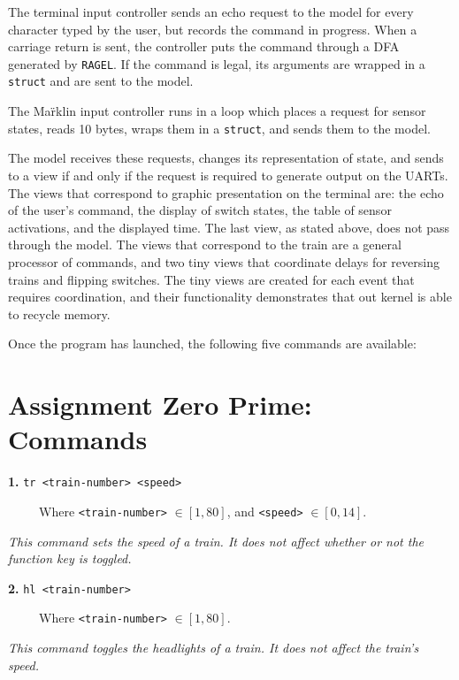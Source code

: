 \documentclass{amsart}
\begin{document}
The terminal input controller sends an echo request to the model for every character typed by the user, but records the command in progress. When a carriage return is sent, the controller puts the command through a DFA generated by \texttt{RAGEL}. If the command is legal, its arguments are wrapped in a \texttt{struct} and are sent to the model.

The Ma\"rklin input controller runs in a loop which places a request for sensor states, reads 10 bytes, wraps them in a \texttt{struct}, and sends them to the model.

The model receives these requests, changes its representation of state, and sends to a view if and only if the request is required to generate output on the UARTs. The views that correspond to graphic presentation on the terminal are: the echo of the user's command, the display of switch states, the table of sensor activations, and the displayed time. The last view, as stated above, does not pass through the model. The views that correspond to the train are a general processor of commands, and two tiny views that coordinate delays for reversing trains and flipping switches. The tiny views are created for each event that requires coordination, and their functionality demonstrates that out kernel is able to recycle memory.

Once the program has launched, the following five commands are available:

\section*{Assignment Zero Prime: Commands}

\vspace{0.3cm}
\textbf{1.} \texttt{tr <train-number> <speed>}

\ \ \ \ \ Where \texttt{<train-number>} $\in [1,80]$, and \texttt{<speed>} $\in [0,14]$.

\vspace{0.3cm}
\textit{This command sets the speed of a train. It does not affect whether or not the function key is toggled.}

\vspace{0.5cm}
\textbf{2.} \texttt{hl <train-number>}

\ \ \ \ \ Where \texttt{<train-number>} $\in [1,80]$.

\vspace{0.3cm}
\textit{This command toggles the headlights of a train. It does not affect the train's speed.}
\end{document}
